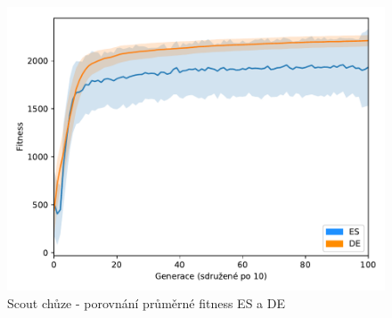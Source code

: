 	\begin{figure}[t]\centering
		\includegraphics[width=\columnwidth]{../img/WoodMap/DEvsES/WCuttorWalkMem}
		\caption{ Scout chůze - porovnání průměrné fitness ES a DE}
		\label{obr04:WalkESvsDE}
	\end{figure}
	\clearpage
	

